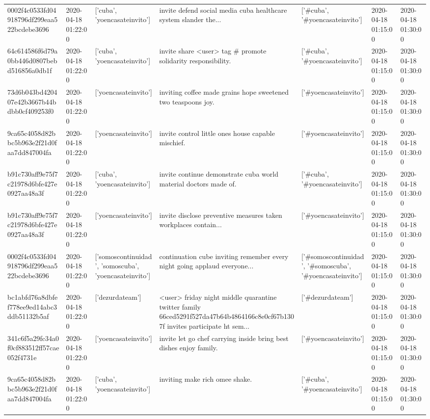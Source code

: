 \begin{tabular}{lllllll}
0002f4c0533fd04918796df299eaa522bcdebe3696 & 2020-04-18 01:22:00 & ['cuba', 'yoencasateinvito'] & invite defend social media cuba healthcare system slander the... & ['#cuba', '#yoencasateinvito'] & 2020-04-18 01:15:00 & 2020-04-18 01:30:00 \\
64c614586f6d79a0bb446d0807bebd516856a0db1f & 2020-04-18 01:22:00 & ['cuba', 'yoencasateinvito'] & invite share <user> tag \# promote solidarity responsibility. & ['#cuba', '#yoencasateinvito'] & 2020-04-18 01:15:00 & 2020-04-18 01:30:00 \\
73d6b043bd420407e42b3667b44bdbb0cf409253f0 & 2020-04-18 01:22:00 & ['yoencasateinvito'] & inviting coffee made grains hope sweetened two teaspoons joy. & ['#yoencasateinvito'] & 2020-04-18 01:15:00 & 2020-04-18 01:30:00 \\
9ca65c4058d82bbc5b963e2f21d0faa7dd847004fa & 2020-04-18 01:22:00 & ['yoencasateinvito'] & invite control little ones house capable mischief. & ['#yoencasateinvito'] & 2020-04-18 01:15:00 & 2020-04-18 01:30:00 \\
b91c730aff9e75f7c21978d6bfe427e0927aa48a3f & 2020-04-18 01:22:00 & ['cuba', 'yoencasateinvito'] & invite continue demonstrate cuba world material doctors made of. & ['#cuba', '#yoencasateinvito'] & 2020-04-18 01:15:00 & 2020-04-18 01:30:00 \\
b91c730aff9e75f7c21978d6bfe427e0927aa48a3f & 2020-04-18 01:22:00 & ['yoencasateinvito'] & invite disclose preventive measures taken workplaces contain... & ['#yoencasateinvito'] & 2020-04-18 01:15:00 & 2020-04-18 01:30:00 \\
0002f4c0533fd04918796df299eaa522bcdebe3696 & 2020-04-18 01:22:00 & ['somoscontinuidad', 'somoscuba', 'yoencasateinvito'] & continuation cube inviting remember every night going applaud everyone... & ['#somoscontinuidad', '#somoscuba', '#yoencasateinvito'] & 2020-04-18 01:15:00 & 2020-04-18 01:30:00 \\
bc1abfd76a8dbfef778ee9ed14abc3ddb51132b5af & 2020-04-18 01:22:00 & ['dezurdateam'] & <user> friday night middle quarantine twitter family 66ced5291f527da47b64b4864166c8e0cf67b1307f invites participate ht sem... & ['#dezurdateam'] & 2020-04-18 01:15:00 & 2020-04-18 01:30:00 \\
341c6f5a29fc34a0f0cf883512ff57cae052f4731e & 2020-04-18 01:22:00 & ['yoencasateinvito'] & invite let go chef carrying inside bring best dishes enjoy family. & ['#yoencasateinvito'] & 2020-04-18 01:15:00 & 2020-04-18 01:30:00 \\
9ca65c4058d82bbc5b963e2f21d0faa7dd847004fa & 2020-04-18 01:22:00 & ['cuba', 'yoencasateinvito'] & inviting make rich omee shake. & ['#cuba', '#yoencasateinvito'] & 2020-04-18 01:15:00 & 2020-04-18 01:30:00 \\

\end{tabular}
